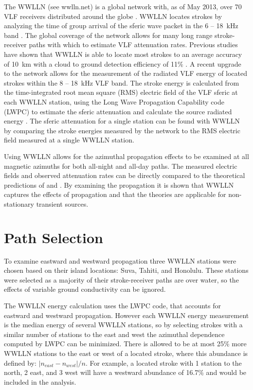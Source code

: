 The WWLLN (see wwlln.net) is a global network with, as of May 2013, over 70 VLF receivers distributed around the globe \citep{Rodger2006, Rodger2009}.
WWLLN locates strokes by analyzing the time of group arrival of the sferic wave packet in the 6 -- 18~kHz band \citep{Dowden2000}.
The global coverage of the network allows for many long range stroke-receiver paths with which to estimate VLF attenuation rates.
Previous studies have shown that WWLLN is able to locate most strokes to an average accuracy of 10~km with a cloud to ground detection efficiency of 11\% \citep{Abarca2010, Rodger2009}.
A recent upgrade to the network allows for the measurement of the radiated VLF energy of located strokes within the 8 -- 18~kHz VLF band.
The stroke energy is calculated from the time-integrated root mean square (RMS) electric field of the VLF sferic at each WWLLN station, using the Long Wave Propagation Capability code (LWPC) \citep{Ferguson1998} to estimate the sferic attenuation and calculate the source radiated energy \citep{Hutchins2012}.
The sferic attenuation for a single station can be found with WWLLN by comparing the stroke energies measured by the network to the RMS electric field measured at a single WWLLN station.

Using WWLLN allows for the azimuthal propagation effects to be examined at all magnetic azimuths for both all-night and all-day paths.
The measured electric fields and observed attenuation rates can be directly compared to the theoretical predictions of \citet{Wait1960a} and \citet{Taylor1960a}.
By examining the propagation it is shown that WWLLN captures the effects of propagation and that the theories are applicable for non-stationary transient sources.

\section{Path Selection}

To examine eastward and westward propagation three WWLLN stations were chosen based on their island locations: Suva, Tahiti, and Honolulu.
These stations were selected as a majority of their stroke-receiver paths are over water, so the effects of variable ground conductivity can be ignored. 

The WWLLN energy calculation uses the LWPC code, that accounts for eastward and westward propagation.
However each WWLLN energy measurement is the median energy of several WWLLN stations, so by selecting strokes with a similar number of stations to the east and west the azimuthal dependence computed by LWPC can be minimized.
There is allowed to be at most 25\% more WWLLN stations to the east or west of a located stroke, where this abundance is defined by: $|n_{east} - n_{west}| / n$.
For example, a located stroke with 1 station to the north, 2 east, and 3 west will have a westward abundance of 16.7\% and would be included in the analysis.

